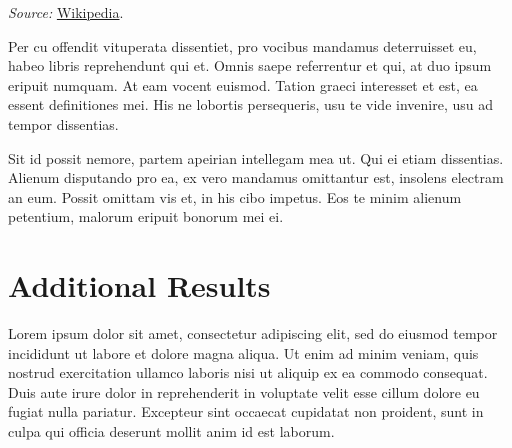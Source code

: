 \documentclass[12pt]{article}
\begin{document}
\begin{table}[tb]
\begin{threeparttable}
\begin{adjustbox}{center}
\begin{tabularx}{\textwidth}{@{}
          >{\hsize=.9\hsize}R >{\hsize}R >{\hsize}R >{\hsize=.9\hsize}R
      @{}}
        \bottomrule
      \end{tabularx}
    \end{adjustbox}

    \begin{tablenotes}\setlength{}\small
      \item \textit{Source:} \href{https://en.wikipedia.org/wiki/List_of_countries_by_population_(United_Nations)}{Wikipedia}.
    \end{tablenotes}
  \end{threeparttable}

\end{table}

Per cu offendit vituperata dissentiet, pro vocibus mandamus deterruisset eu, habeo libris reprehendunt qui et. Omnis saepe referrentur et qui, at duo ipsum eripuit numquam. At eam vocent euismod. Tation graeci interesset et est, ea essent definitiones mei. His ne lobortis persequeris, usu te vide invenire, usu ad tempor dissentias.

Sit id possit nemore, partem apeirian intellegam mea ut. Qui ei etiam dissentias. Alienum disputando pro ea, ex vero mandamus omittantur est, insolens electram an eum. Possit omittam vis et, in his cibo impetus. Eos te minim alienum petentium, malorum eripuit bonorum mei ei.


\newpage



\newpage
\appendix
{}
\renewcommand{\thefigure}{\Alph{section}\arabic{figure}}
\renewcommand{\thetable}{\Alph{section}\arabic{table}}

\section{Additional Results}

Lorem ipsum dolor sit amet, consectetur adipiscing elit, sed do eiusmod tempor incididunt ut labore et dolore magna aliqua. Ut enim ad minim veniam, quis nostrud exercitation ullamco laboris nisi ut aliquip ex ea commodo consequat. Duis aute irure dolor in reprehenderit in voluptate velit esse cillum dolore eu fugiat nulla pariatur. Excepteur sint occaecat cupidatat non proident, sunt in culpa qui officia deserunt mollit anim id est laborum.
\end{document}
